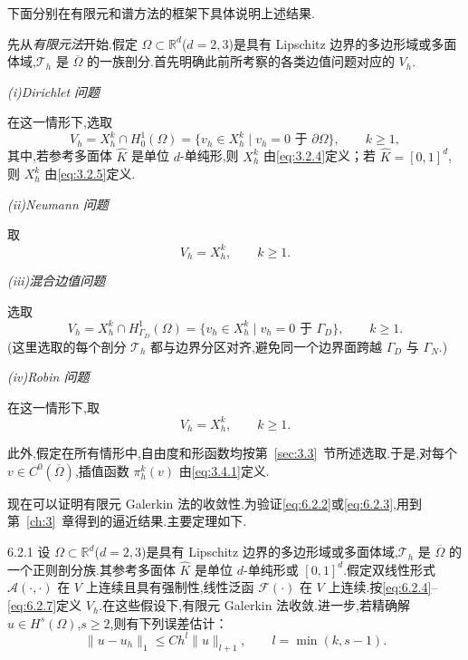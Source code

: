 下面分别在有限元和谱方法的框架下具体说明上述结果.

先从\emph{有限元法}开始.假定 \(\Omega\subset\mathbb R^d\)(\(d=2,3\))是具有 Lipschitz 边界的多边形域或多面体域,\(\mathcal T_h\) 是 \(\overline\Omega\) 的一族剖分.首先明确此前所考察的各类边值问题对应的 \(V_h\).

\medskip
\noindent\textit{(i)Dirichlet 问题}

在这一情形下,选取
\begin{equation}\label{eq:6.2.4}
  V_h=X_h^k\cap H_0^1(\Omega)
     =\{v_h\in X_h^k\mid v_h=0\text{ 于 }\partial\Omega\},\qquad k\ge1,
\end{equation}
其中,若参考多面体 \(\widehat K\) 是单位 \(d\)-单纯形,则 \(X_h^k\) 由\eqref{eq:3.2.4}定义；若 \(\widehat K=[0,1]^d\),则 \(X_h^k\) 由\eqref{eq:3.2.5}定义.

\medskip
\noindent\textit{(ii)Neumann 问题}

取
\begin{equation}\label{eq:6.2.5}
  V_h=X_h^k,\qquad k\ge1.
\end{equation}

\medskip
\noindent\textit{(iii)混合边值问题}

选取
\begin{equation}\label{eq:6.2.6}
  V_h=X_h^k\cap H^1_{\Gamma_D}(\Omega)
       =\{v_h\in X_h^k\mid v_h=0\text{ 于 }\Gamma_D\},\qquad k\ge1.
\end{equation}
(这里选取的每个剖分 \(\mathcal T_h\) 都与边界分区对齐,避免同一个边界面跨越 \(\Gamma_D\) 与 \(\Gamma_N\).)

\medskip
\noindent\textit{(iv)Robin 问题}

在这一情形下,取
\begin{equation}\label{eq:6.2.7}
  V_h=X_h^k,\qquad k\ge1.
\end{equation}

此外,假定在所有情形中,自由度和形函数均按第~\ref{sec:3.3}~节所述选取.于是,对每个 \(v\in C^0(\overline\Omega)\),插值函数 \(\pi_h^k(v)\) 由\eqref{eq:3.4.1}定义.

现在可以证明有限元 Galerkin 法的收敛性.为验证\eqref{eq:6.2.2}或\eqref{eq:6.2.3},用到第~\ref{ch:3}~章得到的逼近结果.主要定理如下.

\begin{theorem}[]{6.2.1}
设 \(\Omega\subset\mathbb R^d\)(\(d=2,3\))是具有 Lipschitz 边界的多边形域或多面体域,\(\mathcal T_h\) 是 \(\overline\Omega\) 的一个正则剖分族.其参考多面体 \(\widehat K\) 是单位 \(d\)-单纯形或 \([0,1]^d\).假定双线性形式 \(\mathcal A(\cdot,\cdot)\) 在 \(V\) 上连续且具有强制性,线性泛函 \(\mathcal F(\cdot)\) 在 \(V\) 上连续.按\eqref{eq:6.2.4}–\eqref{eq:6.2.7}定义 \(V_h\).在这些假设下,有限元 Galerkin 法收敛.进一步,若精确解 \(u\in H^s(\Omega)\),\(s\ge2\),则有下列误差估计：
\begin{equation}\label{eq:6.2.8}
  \|u-u_h\|_1\le Ch^l\|u\|_{l+1},\qquad l=\min(k,s-1).
\end{equation}
\end{theorem}

